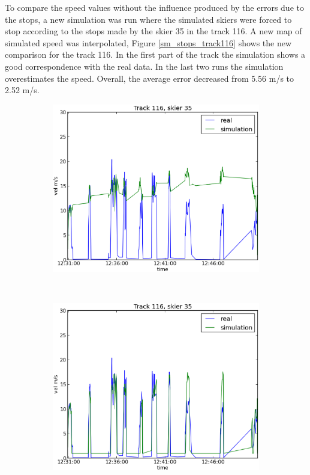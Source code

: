 \documentclass[12pt,a4paper,twoside]{book}
\begin{document}
To compare the speed values without the influence produced by the errors due to the stops, a new simulation was run where the simulated skiers were forced to stop according to the stops made by the skier 35 in the track 116. A new map of simulated speed was interpolated, Figure \ref{sm_stops_track116} shows the new comparison for the track 116. In the first part of the track the simulation shows a good correspondence with the real data. In the last two runs the simulation overestimates the speed. Overall, the average error decreased from 5.56 m/s to 2.52 m/s.

\begin{figure}[!h]
        \centering
        \begin{subfigure}[b]{0.5\textwidth}
                \centering
                \includegraphics[width=\textwidth]{images/sm_track116.eps}
                \caption{}
                \label{Sno_stops}
        \end{subfigure}%
        ~ %
        \begin{subfigure}[b]{0.5\textwidth}
                \centering
                \includegraphics[width=\textwidth]{images/sm_stops_track116.eps}

\end{subfigure}
\end{figure}
\end{document}
